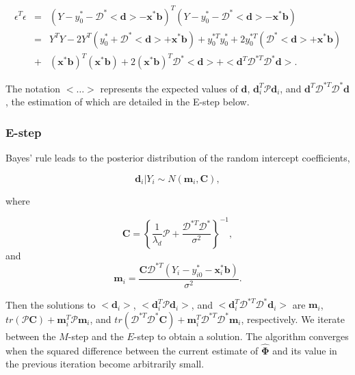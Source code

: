 \documentclass[preprint]{JASA}
\begin{document}
\begin{eqnarray*}
\epsilon^T\epsilon &=& (Y- y_{0}^* - \bm{\mathcal{D}}^*<\mathbf{d}> -  \mathbf{x}^*\mathbf{b})^T(Y - y_{0}^* - \bm{\mathcal{D}}^*<\mathbf{d}> -  \mathbf{x}^*\mathbf{b})\\
&=& Y^TY - 2Y^T\left(y_{0}^* + \bm{\mathcal{D}}^*<\mathbf{d}> + \mathbf{x}^*\mathbf{b}\right) + y_{0}^{*T}
y_{0}^* + 2 y_{0}^{*T}\left( \bm{\mathcal{D}}^*<\mathbf{d}> + \mathbf{x}^*\mathbf{b}  \right) \\
&+& \left( \mathbf{x}^*\mathbf{b}\right)^T\left( \mathbf{x}^*\mathbf{b}\right) + 2 \left( \mathbf{x}^*\mathbf{b}\right)^T \bm{\mathcal{D}}^*<\mathbf{d}> + <\mathbf{d}^T\bm{\mathcal{D}}^{*T}\bm{\mathcal{D}}^*\mathbf{d}>.
\end{eqnarray*}

\noindent The notation \(<\ldots>\) represents the expected values of
\(\mathbf{d}\), \(\mathbf{d}_i^T\mathcal{P}\mathbf{d}_i\), and
\(\mathbf{d}^T\mathcal{D}^{*T}\mathcal{D}^*\mathbf{d}\), the estimation
of which are detailed in the E-step below.

\hypertarget{e-step}{%
\subsubsection{E-step}\label{e-step}}

Bayes' rule leads to the posterior distribution of the random intercept
coefficients,

\[\mathbf{d}_i | Y_i \sim N\left(\mathbf{m}_i , \mathbf{C}\right),\]

\noindent where

\[\mathbf{C} = \left\{\frac{1}{\lambda_d}\mathcal{P} + \frac{\mathcal{D}^{*T}\mathcal{D}^*}{\sigma^2}\right\}^{-1},\]
\noindent and
\[\mathbf{m}_i = \frac{\mathbf{C} \mathcal{D}^{*T}\left(Y_i - y_{i0}^* -  \mathbf{x}_i^*\mathbf{b}\right)}{\sigma^2}.\]

\noindent Then the solutions to \(<\mathbf{d}_i>\),
\(<\mathbf{d}_i^T\mathcal{P}\mathbf{d}_i>\), and
\(<\mathbf{d}_i^T\mathcal{D}^{*T}\mathcal{D}^*\mathbf{d}_i>\) are
\(\mathbf{m}_i\),
\(tr(\mathcal{P}\mathbf{C}) + \mathbf{m}_i^T\mathcal{P}\mathbf{m}_i\),
and
\(tr( \mathcal{D}^{*T}\mathcal{D}^*\mathbf{C}) + \mathbf{m}_i^T\mathcal{D}^{*T}\mathcal{D}^*\mathbf{m}_i\),
respectively. We iterate between the \(M\)-step and the \(E\)-step to
obtain a solution. The algorithm converges when the squared difference
between the current estimate of \(\widehat{\mathbf{\Phi}}\) and its
value in the previous iteration become arbitrarily small.
\end{document}
